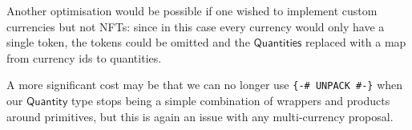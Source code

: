 \documentclass[a4paper]{article}
\newcommand{\s}{\textsf}  %
\newcommand{\qty}{\ensuremath{\s{Quantity}}}
\newcommand{\qtymap}{\ensuremath{\s{Quantities}}}
\begin{document}
\smallskip  Another optimisation would be possible if one wished to
implement custom currencies but not NFTs: since in this case every
currency would only have a single token, the tokens could be omitted
and the \qtymap{} replaced with a map from currency ids to quantities.

\smallskip A more significant cost may be that we can no longer use
\verb|{-# UNPACK #-}| when our \qty{} type stops being a simple
combination of wrappers and products around primitives, but this is
again an issue with any multi-currency proposal.


\end{document}

